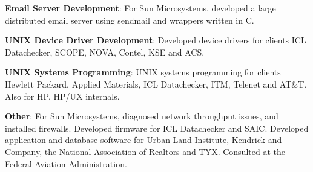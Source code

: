 \documentclass[12pt,margin,line]{res}
\newcommand{\internalskip}{\vspace{-.15in}}
\begin{document}
\begin{resume}
\internalskip
{\footnotesize\bf Email Server Development}:
For Sun Microsystems, developed a large distributed email server using
 sendmail and wrappers written in C.


\internalskip
{\footnotesize\bf UNIX Device Driver Development}:
Developed device drivers for clients ICL Datachecker, SCOPE, NOVA, Contel,
KSE and ACS.

\internalskip
{\footnotesize\bf UNIX Systems Programming}:
UNIX systems programming for clients Hewlett Packard, Applied Materials,
ICL Datachecker, ITM, Telenet and AT\&T.
Also for HP, HP/UX internals.

\internalskip
{\footnotesize\bf Other}:
For Sun Microsystems, diagnosed network throughput issues, and installed
firewalls.
Developed firmware for ICL Datachecker and SAIC.
Developed application and database software for Urban Land Institute, Kendrick
and Company, the National Association of Realtors and TYX.
Consulted at the Federal Aviation Administration.

\end{resume}
\end{document}
